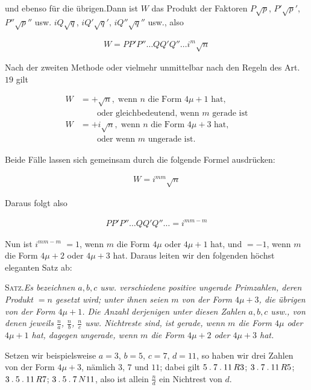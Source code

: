 und ebenso für die übrigen.\quad Dann ist $W$ das Produkt der Faktoren $P\surd p$, $P'\surd p'$, $P''\surd p''$ usw. $iQ\surd q$, $iQ'\surd q'$, $iQ''\surd q''$ usw., also

\[
\begin{aligned}
W=PP'P''\ldots QQ'Q''\ldots i^m\surd n
\end{aligned}
\]

Nach der zweiten Methode oder vielmehr unmittelbar nach den Regeln des Art. $19$ gilt

\[
\begin{aligned}
W&=+\surd n,\;\text{wenn }n\text{ die Form }4\mu+1\text{ hat},\\&\qquad\text{oder gleichbedeutend, wenn }m\text{ gerade ist}\\
W&=+i\surd n,\;\text{wenn }n\text{ die Form }4\mu+3\text{ hat},\\&\qquad\text{oder wenn }m\text{ ungerade ist.}
\end{aligned}
\]

Beide Fälle lassen sich gemeinsam durch die folgende Formel ausdrücken:

\[
\begin{aligned}
W=i^{mm}\surd n
\end{aligned}
\]

Daraus folgt also

\[
\begin{aligned}
PP'P''\ldots QQ'Q''\ldots=i^{mm-m}
\end{aligned}
\]

Nun ist $i^{mm-m}$ $=1$, wenn $m$ die Form $4\mu$ oder $4\mu+1$ hat, und $=-1$, wenn $m$ die Form $4\mu+2$ oder $4\mu+3$ hat. Daraus leiten wir den folgenden höchst eleganten Satz ab:

\textsc{Satz.}\quad \textit{Es bezeichnen $a,b,c$ usw. verschiedene positive ungerade Primzahlen, deren Produkt $=n$ gesetzt wird; unter ihnen seien $m$ von der Form $4\mu+3$, die übrigen von der Form $4\mu+1$. Die Anzahl derjenigen unter diesen Zahlen $a,b,c$ usw., von denen jeweils $\frac{n}{a}$, $\frac{n}{b}$, $\frac{n}{c}$ usw. Nichtreste sind, ist gerade, wenn $m$ die Form $4\mu$ oder $4\mu+1$ hat, dagegen ungerade, wenn $m$ die Form $4\mu+2$ oder $4\mu+3$ hat.}

Setzen wir beispielsweise $a=3$, $b=5$, $c=7$, $d=11$, so haben wir drei Zahlen von der Form $4\mu+3$, nämlich $3$, $7$ und $11$; dabei gilt $5\mathbin{.}7\mathbin{.}11\,R3$; $3\mathbin{.}7\mathbin{.}11\,R5$; $3\mathbin{.}5\mathbin{.}11\,R7$; $3\mathbin{.}5\mathbin{.}7\,N11$, also ist allein $\frac{n}{d}$ ein Nichtrest von $d$.

